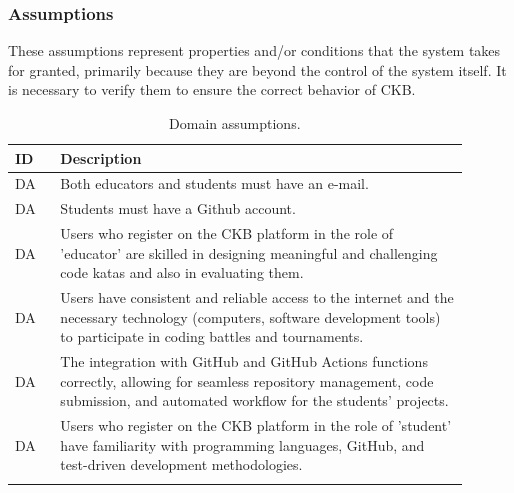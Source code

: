 \subsubsection{Assumptions}
These assumptions represent properties and/or conditions that the system takes for granted, primarily because they are beyond the control of the system itself. It is necessary to verify them to ensure the correct behavior of CKB.
\label{sec:assumptions_dependencies_and_constraints}%
\setcounter{da}{0}
\newcommand{\cda}{\stepcounter{da}\theda}
\begin{center}
    \begin{longtable}{ |l|p{0.9\linewidth}| }
        \hline
        \textbf{ID} & \textbf{Description}                                                                                     \\
        \hline
        DA\cda      & Both educators and students must have an e-mail.                                         \\
         \hline
        DA\cda      & Students must have a  Github account.                                         \\
        \hline
        DA\cda      & Users who register on the CKB platform in the role of 'educator' are skilled  in designing meaningful and challenging code katas and also in evaluating them.                                                                           \\
        \hline
        DA\cda      & Users have consistent and reliable access to the internet and the necessary technology (computers, software development tools) to participate in coding battles and tournaments.                                                       \\
        \hline
        DA\cda      & The integration with GitHub and GitHub Actions functions correctly, allowing for seamless repository management, code submission, and automated workflow for the students’ projects.                                  \\
        \hline
        DA\cda      & Users who register on the CKB platform in the role of 'student'  have familiarity with programming languages,  GitHub, and test-driven development methodologies.        \\
        \hline
        \caption{Domain assumptions.}
        \label{tab:domainassmptn_tab}%
\end{longtable}
\end{center}


